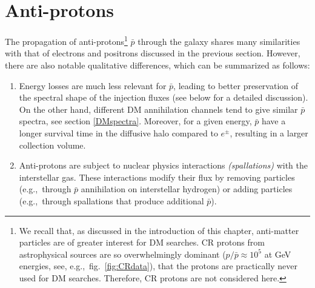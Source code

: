 \section{Anti-protons}\label{anti-protons}
The propagation of anti-protons\footnote{We recall that, as discussed in the introduction of this chapter, anti-matter particles are of greater interest for DM searches. CR protons from astrophysical sources are so overwhelmingly dominant ($p/\bar p \approx 10^5$ at GeV energies, see, e.g.,~fig.~\ref{fig:CRdata}), that the protons are practically never used for DM searches. Therefore, CR protons are not considered here.} $\bar p$ through the galaxy shares many similarities with that of electrons and positrons discussed in the previous section.  
However, there are also notable qualitative differences, which can be summarized as follows:
\begin{enumerate}
\item[i)]  Energy losses are much less relevant for $\bar p$, leading to better preservation of the spectral shape of the injection fluxes (see below for a detailed discussion). 
On the other hand, different DM annihilation channels tend to give  similar $\bar p$ spectra, see section \ref{DMspectra}. 
Moreover, for a given energy, $\bar p$ have a longer survival time in the diffusive halo compared to $e^\pm$, resulting in  a larger collection volume.
\item[ii)]  Anti-protons are subject to  nuclear physics interactions {\em (spallations)} with the interstellar gas.
 These interactions modify their flux by removing particles (e.g.,~through $\bar p$ annihilation on interstellar hydrogen) or adding particles (e.g.,~through spallations that produce additional $\bar p$). 
\end{enumerate}


\smallskip

